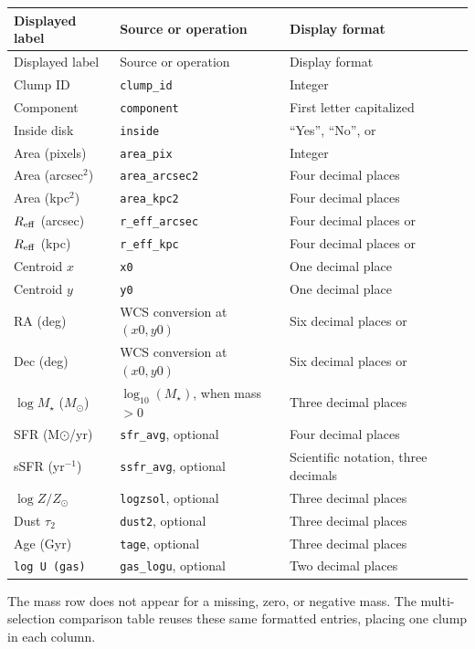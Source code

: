 \documentclass[11pt]{article}
\newcommand{\code}[1]{\texttt{#1}}
\newcommand{\missing}{\textemdash}
\begin{document}
\begin{longtable}{>{\raggedright\arraybackslash}p{} >{\raggedright\arraybackslash}p{} >{\raggedright\arraybackslash}p{}}
\toprule
Displayed label & Source or operation & Display format \\
\midrule
\endfirsthead
\toprule
Displayed label & Source or operation & Display format \\
\midrule
\endhead
\bottomrule
\endfoot
Clump ID & \code{clump\_id} & Integer \\
Component & \code{component} & First letter capitalized \\
Inside disk & \code{inside} & ``Yes'', ``No'', or \missing \\
Area (pixels) & \code{area\_pix} & Integer \\
Area (arcsec$^2$) & \code{area\_arcsec2} & Four decimal places \\
Area (kpc$^2$) & \code{area\_kpc2} & Four decimal places \\
$R_{\rm eff}$ (arcsec) & \code{r\_eff\_arcsec} & Four decimal places or \missing \\
$R_{\rm eff}$ (kpc) & \code{r\_eff\_kpc} & Four decimal places or \missing \\
Centroid $x$ & \code{x0} & One decimal place \\
Centroid $y$ & \code{y0} & One decimal place \\
RA (deg) & WCS conversion at $(x0,y0)$ & Six decimal places or \missing \\
Dec (deg) & WCS conversion at $(x0,y0)$ & Six decimal places or \missing \\
\addlinespace
$\log M_\star$ ($M_\odot$) & $\log_{10}(M_\star)$, when mass $>0$ & Three decimal places \\
SFR (M$\odot$/yr) & \code{sfr\_avg}, optional & Four decimal places \\
sSFR (yr$^{-1}$) & \code{ssfr\_avg}, optional & Scientific notation, three decimals \\
$\log Z/Z_\odot$ & \code{logzsol}, optional & Three decimal places \\
Dust $\tau_2$ & \code{dust2}, optional & Three decimal places \\
Age (Gyr) & \code{tage}, optional & Three decimal places \\
\code{log U (gas)} & \code{gas\_logu}, optional & Two decimal places \\
\end{longtable}
The mass row does not appear for a missing, zero, or negative mass. The multi-selection comparison table reuses these same formatted entries, placing one clump in each column.
\end{document}
